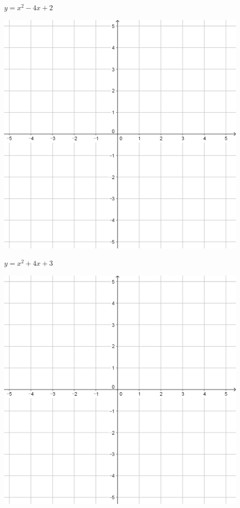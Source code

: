 \documentclass[a4paper]{oblivoir}
\begin{document}
\begin{minipage}{0.45\textwidth}\centering
\(y=x^2-4x+2\)
\par\bigskip\includegraphics[width=0.9\textwidth]{55}
\end{minipage}
\begin{minipage}{0.45\textwidth}\centering
\(y=x^2+4x+3\)
\par\bigskip\includegraphics[width=0.9\textwidth]{55}
\end{minipage}\bigskip\bigskip\par
\end{document}
